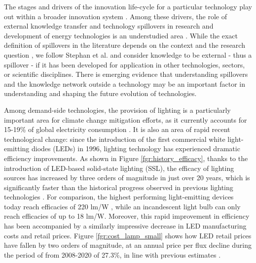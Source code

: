 \documentclass[twoside,twocolumn,9pt]{article}
\begin{document}
The stages and drivers of the innovation life-cycle for a particular technology play out within a broader innovation system \cite{grubler2012policies}\cite{Anadon2016}. Among these drivers, the role of external  knowledge transfer and technology spillovers in research and development of energy technologies is an understudied area  \cite{Stephan2021}. While the exact definition of spillovers in the literature depends on the context and the research question \cite{Liu2003}\cite{Nemet2012}, we follow Stephan et al. \cite{Stephan2021} and consider knowledge to be external - thus a spillover -  if it has been developed for application in other technologies, sectors, or scientific disciplines. There is emerging evidence that understanding spillovers and the knowledge network outside a technology may be an important factor in understanding \cite{Pichler2020} and shaping \cite{Clark2016}\cite{Stephan2021}\cite{Sun2021}\cite{kolesnikov2022technology} the future evolution of technologies.  

Among demand-side technologies, the provision of lighting is a particularly important area for climate change mitigation efforts, as it currently   accounts for 15-19\% of global electricity consumption \cite{Zissis2016}\cite{doe_electricity}. It is also an area of rapid recent technological change: since the introduction of the first commercial white light-emitting diodes (LEDs) in 1996, lighting technology has experienced dramatic efficiency improvements.  As shown in Figure \ref{fgr:history_efficacy}, thanks to the introduction of LED-based solid-state lighting (SSL), the efficacy of lighting sources has increased by three orders of magnitude in just over 20 years, which is significantly faster than the historical progress observed in previous lighting technologies \cite{weinold2021quantifying}. For comparison, the highest performing light-emitting devices today reach efficacies of 220 lm/W \cite{lumistrips2021mid}, while an incandescent light bulb can only reach efficacies of up to 18 lm/W. Moreover, this rapid improvement in efficiency has been accompanied by a similarly impressive decrease in LED manufacturing costs and retail prices. Figure \ref{fgr:cost_lamp_small} shows how LED retail prices have fallen by two orders of magnitude, at an annual price per flux decline during the period of from 2008-2020 of 27.3\%, in line with previous estimates \cite{Gerke2020}.  
\end{document}
